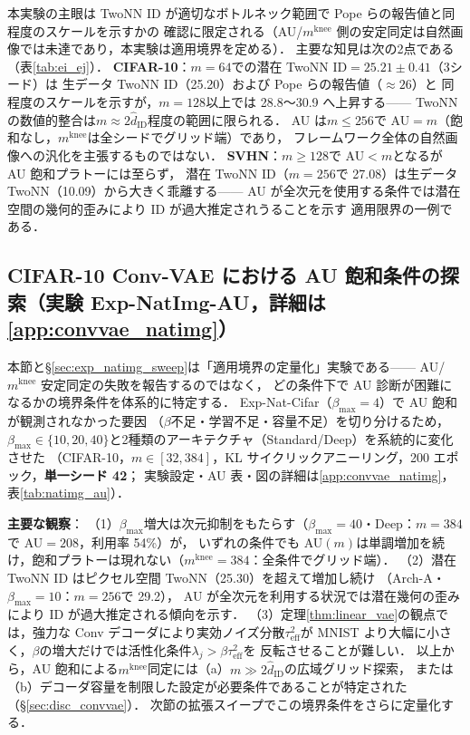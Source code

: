 \documentclass[11pt,a4paper]{jsarticle}
\newcommand{\mknee}{m^{\mathrm{knee}}}
\begin{document}
本実験の主眼は TwoNN ID が適切なボトルネック範囲で Pope らの報告値と同程度のスケールを示すかの
確認に限定される（AU/$\mknee$ 側の安定同定は自然画像では未達であり，本実験は適用境界を定める）．
主要な知見は次の2点である（表\ref{tab:ei_ej}）．
\textbf{CIFAR-10}：$m=64$での潜在 TwoNN ID$=25.21\pm0.41$（3シード）は
生データ TwoNN ID（25.20）および Pope ら\cite{pope2021intrinsic}の報告値（$\approx 26$）と
同程度のスケールを示すが，$m=128$以上では 28.8〜30.9 へ上昇する——
TwoNN の数値的整合は$m \approx 2\hat{d}_\mathrm{ID}$程度の範囲に限られる．
AU は$m \leq 256$で AU$=m$（飽和なし，$\mknee$は全シードでグリッド端）であり，
フレームワーク全体の自然画像への汎化を主張するものではない．
\textbf{SVHN}：$m \geq 128$で AU$<m$となるが AU 飽和プラトーには至らず，
潜在 TwoNN ID（$m=256$で 27.08）は生データ TwoNN（10.09）から大きく乖離する——
AU が全次元を使用する条件では潜在空間の幾何的歪みにより ID が過大推定されうることを示す
適用限界の一例である．

\subsection{CIFAR-10 Conv-VAE における AU 飽和条件の探索（実験 Exp-NatImg-AU，詳細は\ref{app:convvae_natimg}）}\label{sec:exp_natimg_au}

本節と§\ref{sec:exp_natimg_sweep}は「適用境界の定量化」実験である——
AU/$\mknee$ 安定同定の失敗を報告するのではなく，
どの条件下で AU 診断が困難になるかの境界条件を体系的に特定する．
Exp-Nat-Cifar（$\beta_{\max}=4$）で AU 飽和が観測されなかった要因
（$\beta$不足・学習不足・容量不足）を切り分けるため，
$\beta_{\max} \in \{10, 20, 40\}$と2種類のアーキテクチャ（Standard/Deep）を系統的に変化させた
（CIFAR-10，$m \in [32, 384]$，KL サイクリックアニーリング，200 エポック，\textbf{単一シード 42}；
実験設定・AU 表・図の詳細は\ref{app:convvae_natimg}，表\ref{tab:natimg_au}）．

\textbf{主要な観察}：
（1）$\beta_{\max}$増大は次元抑制をもたらす（$\beta_{\max}=40$・Deep：$m=384$で AU$=208$，利用率 54\%）が，
いずれの条件でも AU$(m)$は単調増加を続け，飽和プラトーは現れない（$\mknee=384$：全条件でグリッド端）．
（2）潜在 TwoNN ID はピクセル空間 TwoNN（25.30）を超えて増加し続け
（Arch-A・$\beta_{\max}=10$：$m=256$で 29.2），
AU が全次元を利用する状況では潜在幾何の歪みにより ID が過大推定される傾向を示す．
（3）定理\ref{thm:linear_vae}の観点では，強力な Conv デコーダにより実効ノイズ分散$\tau^2_\mathrm{eff}$が
MNIST より大幅に小さく，$\beta$の増大だけでは活性化条件$\lambda_j > \beta\tau^2_\mathrm{eff}$を
反転させることが難しい．
以上から，AU 飽和による$\mknee$同定には（a）$m \gg 2\hat{d}_\mathrm{ID}$の広域グリッド探索，
または（b）デコーダ容量を制限した設定が必要条件であることが特定された（§\ref{sec:disc_convvae}）．
次節の拡張スイープでこの境界条件をさらに定量化する．
\end{document}
